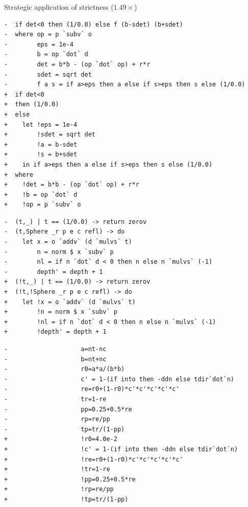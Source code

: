 \documentclass[8pt]{beamer}
\begin{document}
\begin{frame}[fragile]{Strategic application of strictness ($1.49\times$)}
\begin{verbatim}
-  if det<0 then (1/0.0) else f (b-sdet) (b+sdet)
-  where op = p `subv` o
-        eps = 1e-4
-        b = op `dot` d
-        det = b*b - (op `dot` op) + r*r
-        sdet = sqrt det
-        f a s = if a>eps then a else if s>eps then s else (1/0.0)
+  if det<0
+  then (1/0.0)
+  else
+    let !eps = 1e-4
+        !sdet = sqrt det
+        !a = b-sdet
+        !s = b+sdet
+    in if a>eps then a else if s>eps then s else (1/0.0)
+  where
+    !det = b*b - (op `dot` op) + r*r
+    !b = op `dot` d
+    !op = p `subv` o
\end{verbatim}


\begin{verbatim}
-  (t,_) | t == (1/0.0) -> return zerov
-  (t,Sphere _r p e c refl) -> do
-    let x = o `addv` (d `mulvs` t)
-        n = norm $ x `subv` p
-        nl = if n `dot` d < 0 then n else n `mulvs` (-1)
-        depth' = depth + 1
+  (!t,_) | t == (1/0.0) -> return zerov
+  (!t,!Sphere _r p e c refl) -> do
+    let !x = o `addv` (d `mulvs` t)
+        !n = norm $ x `subv` p
+        !nl = if n `dot` d < 0 then n else n `mulvs` (-1)
+        !depth' = depth + 1
\end{verbatim}
\begin{verbatim}
-                    a=nt-nc
-                    b=nt+nc
-                    r0=a*a/(b*b)
-                    c' = 1-(if into then -ddn else tdir`dot`n)
-                    re=r0+(1-r0)*c'*c'*c'*c'*c'
-                    tr=1-re
-                    pp=0.25+0.5*re
-                    rp=re/pp
-                    tp=tr/(1-pp)
+                    !r0=4.0e-2
+                    !c' = 1-(if into then -ddn else tdir`dot`n)
+                    !re=r0+(1-r0)*c'*c'*c'*c'*c'
+                    !tr=1-re
+                    !pp=0.25+0.5*re
+                    !rp=re/pp
+                    !tp=tr/(1-pp)
\end{verbatim}
\end{frame}
\end{document}
